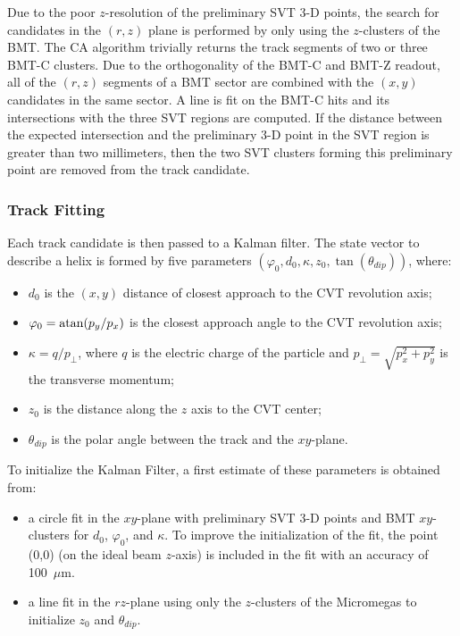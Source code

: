 Due to the poor $z$-resolution of the preliminary SVT 3-D points, the search for candidates in the $(r,z)$ plane is
performed by only using the $z$-clusters of the BMT. The CA algorithm trivially returns the track segments of two
or three BMT-C clusters. Due to the orthogonality of the BMT-C and BMT-Z readout, all of the $(r,z)$ segments of
a BMT sector are combined with the $(x,y)$ candidates in the same sector. A line is fit on the BMT-C hits and
its intersections with the three SVT regions are computed. If the distance between the expected intersection and
the preliminary 3-D point in the SVT region is greater than two millimeters, then the two SVT clusters forming this
preliminary point are removed from the track candidate.

\subsubsection{Track Fitting}

Each track candidate is then passed to a Kalman filter. The state vector to describe a helix is formed by five
parameters $(\varphi_0, d_0, \kappa, z_0, \tan(\theta_{dip}))$, where:

\begin{itemize}
\item $d_0$ is the $(x,y)$ distance of closest approach to the CVT revolution axis;
\item $\varphi_0 = {\rm atan}(p_y/p_x)$ is the closest approach angle to the CVT revolution axis;
\item $\kappa=q/p_\perp$, where $q$ is the electric charge of the particle and $p_\perp=\sqrt{p_x^2+p_y^2}$ is
  the transverse momentum;
\item $z_0$ is the distance along the $z$ axis to the CVT center;
\item $\theta_{dip}$ is the polar angle between the track and the $xy$-plane.
\end{itemize}

To initialize the Kalman Filter, a first estimate of these parameters is obtained from:

\begin{itemize}
\item a circle fit in the $xy$-plane with preliminary SVT 3-D points and BMT $xy$-clusters for $d_0$,
  $\varphi_0$, and $\kappa$. To improve the initialization of the fit, the point (0,0) (on the ideal beam $z$-axis)
  is included in the fit with an accuracy of 100~$\mu$m.
\item a line fit in the $rz$-plane using only the $z$-clusters of the Micromegas to initialize $z_0$ and $\theta_{dip}$.
\end{itemize}

